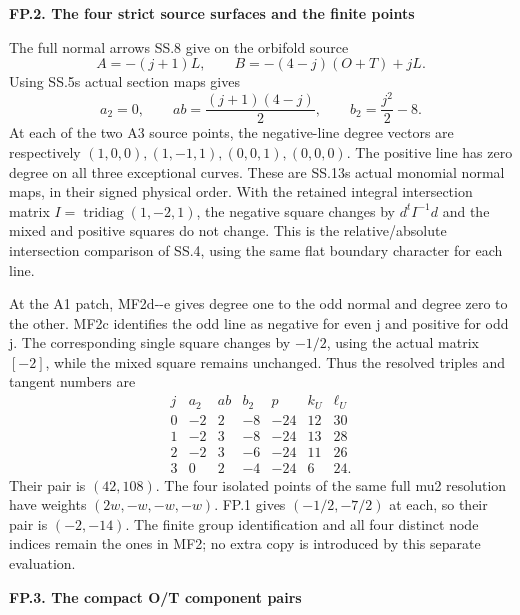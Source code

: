 \par

\medskip\noindent\textbf{FP.2. The four strict source surfaces and the finite points}

\par\nobreak

The full normal arrows SS.8 give on the orbifold source
\[
 A=-(j+1)L,\qquad B=-(4-j)(O+T)+jL.
\]
Using SS.5\textquotesingle s actual section maps gives
\[
 a_2=0,\qquad a b=\frac{(j+1)(4-j)}2,\qquad
 b_2=\frac{j^2}{2}-8.                                 \tag{FP.4}
\]
At each of the two A3 source points, the negative-line
degree vectors are respectively
\((1,0,0),(1,-1,1),(0,0,1),(0,0,0)\). The positive
line has zero degree on all three exceptional curves.
These are SS.13\textquotesingle s actual monomial normal maps, in their
signed physical order. With the retained integral
intersection matrix \(I=\operatorname{tridiag}(1,-2,1)\),
the negative square changes by \(d^tI^{-1}d\) and the
mixed and positive squares do not change. This is the
relative/absolute intersection comparison of SS.4,
using the same flat boundary character for each line.

At the A1 patch, MF2d-\/-e gives degree one to the odd
normal and degree zero to the other. MF2c identifies
the odd line as negative for even j and positive for
odd j. The corresponding single square changes by
\(-1/2\), using the actual matrix \([-2]\), while
the mixed square remains unchanged. Thus the resolved
triples and tangent numbers are
\[
\begin{array}{c|rrrr|rr}
 j&a_2&a b&b_2&p&k_U&\ell_U\\\hline
 0&-2&2&-8&-24&12&30\\
 1&-2&3&-8&-24&13&28\\
 2&-2&3&-6&-24&11&26\\
 3&0&2&-4&-24&6&24.
\end{array}                                             \tag{FP.5}
\]
Their pair is \((42,108)\). The four isolated points
of the same full mu2 resolution have weights
\((2w,-w,-w,-w)\). FP.1 gives \((-1/2,-7/2)\)
at each, so their pair is \((-2,-14)\). The finite
group identification and all four distinct node
indices remain the ones in MF2; no extra copy is
introduced by this separate evaluation.

\par

\medskip\noindent\textbf{FP.3. The compact O/T component pairs}

\par\nobreak

